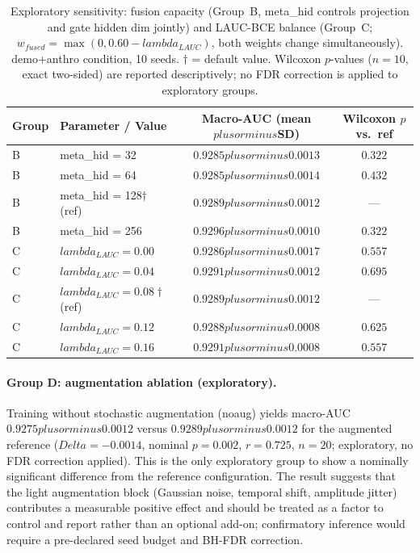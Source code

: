 \documentclass[mathematics,article,submit,pdftex]{Definitions/mdpi}
\def\texttt#1{#1}%
\def\mathrm#1{#1}%
\def\textbf#1{#1}%
\def\Delta{Delta }%
\def\pm{plus or minus }%
\def\lambda{lambda }%
\begin{document}
\begin{table}[H]
\caption{Exploratory sensitivity: fusion capacity (Group~B, \texttt{meta\_hid} controls projection and gate hidden dim jointly) and LAUC-BCE balance (Group~C; $w_{\mathrm{fused}} = \max(0,0.60-\lambda_{\mathrm{LAUC}})$, both weights change simultaneously). \texttt{demo+anthro} condition, 10 seeds. $\dagger$ = default value. Wilcoxon $p$-values ($n{=}10$, exact two-sided) are reported descriptively; no FDR correction is applied to exploratory groups.}\label{tab:sensitivity}
\small\centering
\begin{tabular}{llcc}
\toprule
\textbf{Group} & \textbf{Parameter / Value} & \textbf{Macro-AUC (mean$\pm$SD)} & \textbf{Wilcoxon $p$ vs.\ ref} \\
\midrule
B & \texttt{meta\_hid} = 32  & $0.9285\pm0.0013$ & $0.322$ \\
B & \texttt{meta\_hid} = 64  & $0.9285\pm0.0014$ & $0.432$ \\
B & \texttt{meta\_hid} = 128$\dagger$ (ref) & $0.9289\pm0.0012$ & --- \\
B & \texttt{meta\_hid} = 256 & $0.9296\pm0.0010$ & $0.322$ \\
\midrule
C & $\lambda_{\mathrm{LAUC}} = 0.00$ & $0.9286\pm0.0017$ & $0.557$ \\
C & $\lambda_{\mathrm{LAUC}} = 0.04$ & $0.9291\pm0.0012$ & $0.695$ \\
C & $\lambda_{\mathrm{LAUC}} = 0.08\dagger$ (ref) & $0.9289\pm0.0012$ & --- \\
C & $\lambda_{\mathrm{LAUC}} = 0.12$ & $0.9288\pm0.0008$ & $0.625$ \\
C & $\lambda_{\mathrm{LAUC}} = 0.16$ & $0.9291\pm0.0008$ & $0.557$ \\
\bottomrule
\end{tabular}
\end{table}

\paragraph{Group D: augmentation ablation (exploratory).}
Training without stochastic augmentation (\texttt{noaug}) yields macro-AUC $0.9275{\pm}0.0012$ versus $0.9289{\pm}0.0012$ for the augmented reference ($\Delta{=}{-}0.0014$, nominal $p{=}0.002$, $r{=}0.725$, $n{=}20$; exploratory, no FDR correction applied). This is the only exploratory group to show a nominally significant difference from the reference configuration. The result suggests that the light augmentation block (Gaussian noise, temporal shift, amplitude jitter) contributes a measurable positive effect and should be treated as a factor to control and report rather than an optional add-on; confirmatory inference would require a pre-declared seed budget and BH-FDR correction.
\end{document}
